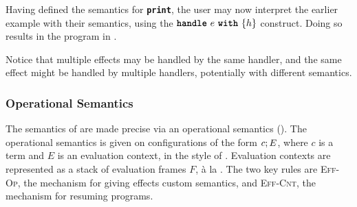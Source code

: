 % 
Having defined the semantics for \textbf{\texttt{print}}, the user may now interpret the earlier example with their semantics, using the $\textbf{\texttt{handle}} \,\, {e} \,\, \textbf{\texttt{with}} \,\, \{{h}\}$ construct. Doing so results in the program in .

Notice that multiple effects may be handled by the same handler, and the same effect might be handled by multiple handlers, potentially with different semantics. 

\subsubsection{Operational Semantics}
The semantics of \efflang{} are made precise via an operational semantics (). The operational semantics is given on configurations of the form ${c}; {E}$, where $c$ is a term and $E$ is an evaluation context, in the style of \citet{felleisen-87}. Evaluation contexts are represented as a stack of evaluation frames $F$, à la \citet{kiselyov-2012}. The two key rules are \textsc{Eff-Op}, the mechanism for giving effects custom semantics, and \textsc{Eff-Cnt}, the mechanism for resuming programs. 


